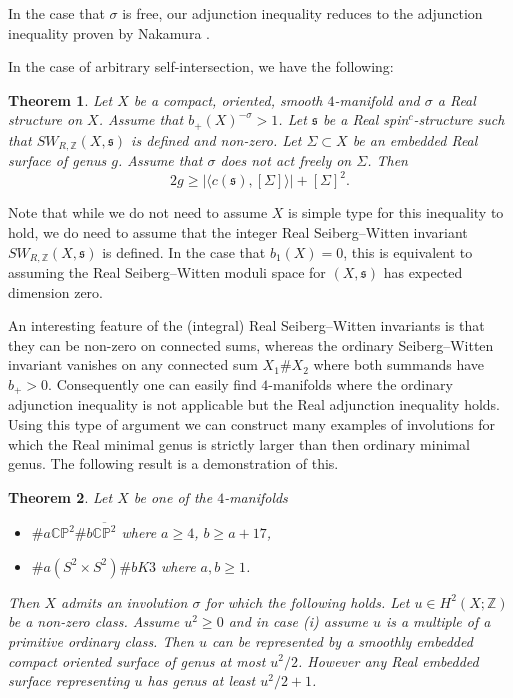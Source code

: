 \documentclass{amsart}
\newtheorem{theorem}{Theorem}[section]
\theoremstyle{definition}
\theoremstyle{remark}
\numberwithin{equation}{section}
\begin{document}
In the case that $\sigma$ is free, our adjunction inequality reduces to the adjunction inequality proven by Nakamura \cite{nak}.

In the case of arbitrary self-intersection, we have the following:

\begin{theorem}
Let $X$ be a compact, oriented, smooth $4$-manifold and $\sigma$ a Real structure on $X$. Assume that $b_+(X)^{-\sigma} > 1$. Let $\mathfrak{s}$ be a Real spin$^c$-structure such that $SW_{R,\mathbb{Z}}(X , \mathfrak{s})$ is defined and non-zero. Let $\Sigma \subset X$ be an embedded Real surface of genus $g$. Assume that $\sigma$ does not act freely on $\Sigma$. Then
\[
2g \ge | \langle c(\mathfrak{s}) , [\Sigma] \rangle | + [\Sigma]^2.
\]
\end{theorem}

Note that while we do not need to assume $X$ is simple type for this inequality to hold, we do need to assume that the integer Real Seiberg--Witten invariant $SW_{R,\mathbb{Z}}(X,\mathfrak{s})$ is defined. In the case that $b_1(X) = 0$, this is equivalent to assuming the Real Seiberg--Witten moduli space for $(X,\mathfrak{s})$ has expected dimension zero.

An interesting feature of the (integral) Real Seiberg--Witten invariants is that they can be non-zero on connected sums, whereas the ordinary Seiberg--Witten invariant vanishes on any connected sum $X_1 \# X_2$ where both summands have $b_+ > 0$. Consequently one can easily find $4$-manifolds where the ordinary adjunction inequality is not applicable but the Real adjunction inequality holds. Using this type of argument we can construct many examples of involutions for which the Real minimal genus is strictly larger than then ordinary minimal genus. The following result is a demonstration of this.

\begin{theorem}
Let $X$ be one of the $4$-manifolds
\begin{itemize}
\item[(i)]{$\# a \mathbb{CP}^2 \# b \overline{\mathbb{CP}^2}$ where $a \ge 4$, $b \ge a+17$,}
\item[(ii)]{$\# a(S^2 \times S^2) \# b K3$ where $a,b \ge 1$.}
\end{itemize}
Then $X$ admits an involution $\sigma$ for which the following holds. Let $u \in H^2(X ; \mathbb{Z})$ be a non-zero class. Assume $u^2 \ge 0$ and in case (i) assume $u$ is a multiple of a primitive ordinary class. Then $u$ can be represented by a smoothly embedded compact oriented surface of genus at most $u^2/2$. However any Real embedded surface representing $u$ has genus at least $u^2/2 + 1$.
\end{theorem}
\end{document}
